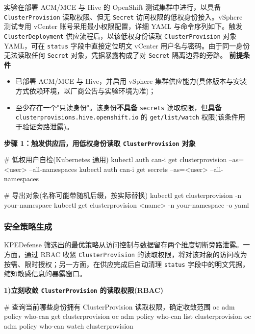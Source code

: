 实验在部署 ACM/MCE 与 Hive 的 OpenShift 测试集群中进行，以具备 \texttt{ClusterProvision} 读取权限、但无 \texttt{Secret} 访问权限的低权身份接入。vSphere 测试专用 vCenter 账号采用最小权限配置，详细 YAML 与命令序列如下。触发 \texttt{ClusterDeployment} 供应流程后，以该低权身份读取 \texttt{ClusterProvision} 对象 YAML，可在 \texttt{status} 字段中直接定位明文 vCenter 用户名与密码。由于同一身份无法读取任何 \texttt{Secret} 对象，凭据暴露构成了对 \texttt{Secret} 隔离边界的旁路。
\textbf{前提条件}
\begin{itemize}
    \item 已部署 ACM/MCE 与 Hive，并启用 vSphere 集群供应能力(具体版本与安装方式依赖环境，以厂商公告与实验环境为准)；
    \item 至少存在一个"只读身份"。该身份\textbf{不具备} \texttt{secrets} 读取权限，但\textbf{具备} \texttt{clusterprovisions\allowbreak.\allowbreak hive\allowbreak.\allowbreak openshift\allowbreak.\allowbreak io} 的 \texttt{get/list/watch} 权限(该条件用于验证旁路泄露)。
\end{itemize}
\textbf{步骤 1：触发供应后，用低权身份读取 \texttt{ClusterProvision} 对象}
\begin{AppendixCode}
# 低权用户自检(Kubernetes 通用)
kubectl auth can-i get clusterprovision --as=<user> --all-namespaces
kubectl auth can-i get secrets --as=<user> --all-namespaces

# 导出对象(名称可能带随机后缀，按实际替换)
kubectl get clusterprovision -n your-namespace
kubectl get clusterprovision <name> -n your-namespace -o yaml
\end{AppendixCode}


\subsubsection{安全策略生成}

KPEDefense 筛选出的最优策略从访问控制与数据留存两个维度切断旁路泄露。一方面，通过 RBAC 收紧 \texttt{ClusterProvision} 的读取权限，将对该对象的访问改为按需、限时授权；另一方面，在供应完成后自动清理 \texttt{status} 字段中的明文凭据，缩短敏感信息的暴露窗口。

\textbf{1)立刻收敛 \texttt{ClusterProvision} 的读取权限(RBAC)}
\begin{AppendixCode}
# 查询当前哪些身份拥有 ClusterProvision 读取权限，确定收敛范围
oc adm policy who-can get clusterprovision
oc adm policy who-can list clusterprovision
oc adm policy who-can watch clusterprovision
\end{AppendixCode}

